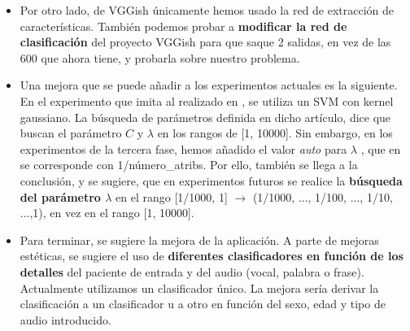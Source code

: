 \begin{itemize}
\begin{itemize}
	\end{itemize}
\item Por otro lado, de VGGish únicamente hemos usado la red de extracción de características. También podemos probar a \textbf{modificar la red de clasificación} del proyecto VGGish para que saque 2 salidas, en vez de las 600 que ahora tiene, y probarla sobre nuestro problema.
\item Una mejora que se puede añadir a los experimentos actuales es la siguiente. En el experimento que imita al realizado en \cite{Orz2016}, se utiliza un SVM con kernel gaussiano. La búsqueda de parámetros definida en dicho artículo, dice que buscan el parámetro $C$ y $\lambda$ en los rangos de [1, 10000]. Sin embargo, en los experimentos de la tercera fase, hemos añadido el valor  \textit{auto} para $\lambda$ , que en  se corresponde con 1/número\_atribs. Por ello, también se llega a la conclusión, y se sugiere, que en experimentos futuros se realice la \textbf{búsqueda del parámetro $\lambda$} en el rango [1/1000, 1] $\rightarrow$ (1/1000, ..., 1/100, ..., 1/10, ...,1), en vez en el rango [1, 10000].
\item Para terminar, se sugiere la mejora de la aplicación. A parte de mejoras estéticas, se sugiere el uso de \textbf{diferentes clasificadores en función de los detalles} del paciente de entrada y del audio (vocal, palabra o frase). Actualmente utilizamos un clasificador único. La mejora sería derivar la clasificación a un clasificador u a otro en función del sexo, edad y tipo de audio introducido.
\end{itemize}
